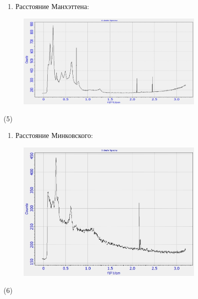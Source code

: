 \begin{enumerate}
\def\labelenumi{\arabic{enumi}.}
\setcounter{enumi}{1}
\item
  Расстояние Манхэттена:
\end{enumerate}

\begin{figure}[H]
	\centering
	\includegraphics[width=0.8\textwidth]{assets/15}
	\caption*{}
\end{figure} (5)

\begin{enumerate}
\def\labelenumi{\arabic{enumi}.}
\setcounter{enumi}{2}
\item
  Расстояние Минковского:
\end{enumerate}

\begin{figure}[H]
	\centering
	\includegraphics[width=0.8\textwidth]{assets/16}
	\caption*{}
\end{figure} (6)

